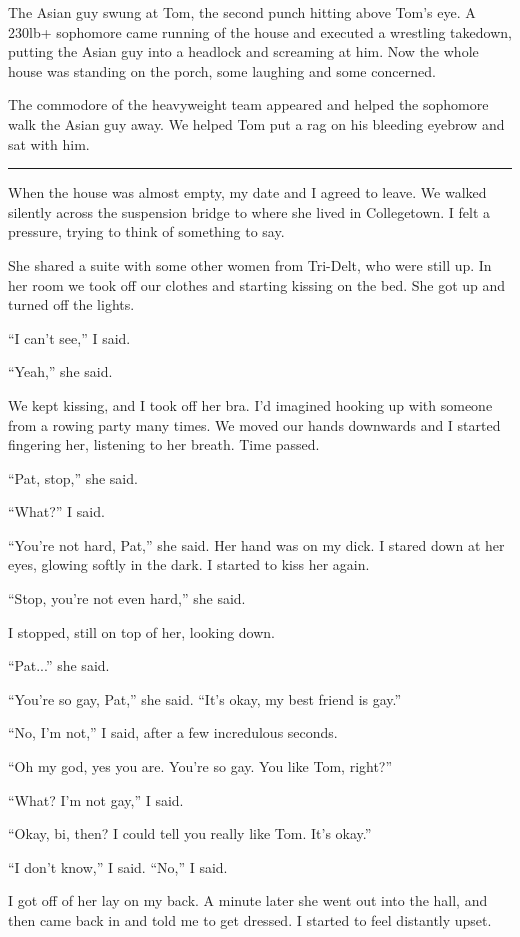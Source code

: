 The Asian guy swung at Tom, the second punch hitting above Tom's eye.  A 230lb+
sophomore came running of the house and executed a wrestling takedown, putting
the Asian guy into a headlock and screaming at him.   Now the whole house was
standing on the porch, some laughing and some concerned.

The commodore of the heavyweight team appeared and helped the sophomore walk the
Asian guy away.  We helped Tom put a rag on his bleeding eyebrow and sat with
him.  

\plainfancybreak{12pt}{2}{* * *}

When the house was almost empty, my date and I agreed to leave.  We walked
silently across the suspension bridge to where she lived in Collegetown.  I felt
a pressure, trying to think of something to say.

She shared a suite with some other women from Tri-Delt, who were still up.  In
her room we took off our clothes and starting kissing on the bed.  She got up
and turned off the lights.

``I can't see,'' I said.  

``Yeah,'' she said.

We kept kissing, and I took off her bra.  I'd imagined hooking up with someone
from a rowing party many times.  We moved our hands downwards and I started
fingering her, listening to her breath.  Time passed.

``Pat, stop,'' she said.

``What?'' I said.

``You're not hard, Pat,'' she said.  Her hand was on my dick.  I stared down at
her eyes, glowing softly in the dark.  I started to kiss her again.

``Stop, you're not even hard,'' she said.

I stopped, still on top of her, looking down.

``Pat...'' she said.

``You're so gay, Pat,'' she said.  ``It's okay, my best friend is gay.''

``No, I'm not,'' I said, after a few incredulous seconds.

``Oh my god, yes you are.  You're so gay.  You like Tom, right?''

``What?  I'm not gay,'' I said.

``Okay, bi, then?  I could tell you really like Tom.  It's okay.''

``I don't know,'' I said.  ``No,'' I said.

I got off of her lay on my back.  A minute later she went out into the hall, and
then came back in and told me to get dressed.  I started to feel distantly
upset.


